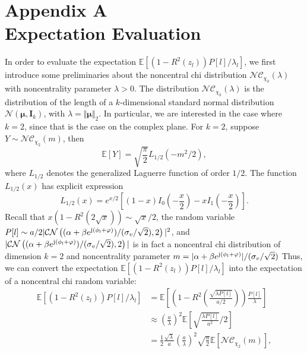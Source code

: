\documentclass[12pt,draftclsnofoot,journal,onecolumn]{IEEEtran}
\theoremstyle{nonumberplain}
\def \CN {\mathcal{CN}}
\def \j  {\rm {j}}
\def \nc {\mathcal{NC}}
\begin{document}
\section*{Appendix A\\ Expectation Evaluation}\label{appendix: expectation evaluation}
    In order to evaluate the expectation $\mathbb{E}[(1-R^2(z_l))P[l]/\lambda_l]$, we first introduce some preliminaries about the noncentral chi distribution $\nc_{\chi_k}(\lambda)$ with noncentrality parameter $\lambda>0$. The distribution $\nc_{\chi_k}(\lambda)$ is the distribution of the length of a $k$-dimensional standard normal distribution $\mathcal{N}({\bm \mu}, {\bm I}_k)$, with $\lambda = \Vert {\bm \mu} \Vert_2$. In particular, we are interested in the case where $k=2$, since that is the case on the complex plane. For  $k=2$, suppose $Y \sim \nc_{\chi_2}(m)$, then
    \begin{equation}
        \mathbb{E}\left[Y\right] = \sqrt{\frac{\pi}{2}}L_{1/2}(-m^2/2),
        \label{eqn:noncentral chi mean}
    \end{equation}
    where $L_{1/2}$ denotes the generalized Laguerre function of order $1/2$. The function $L_{1/2}(x)$ has explicit expression 
    \begin{equation}
        L_{1/2}(x) = e^{x/2}\left[(1-x)I_0\left(-\frac{x}{2}\right)-xI_1\left(-\frac{x}{2}\right) \right].
        \label{eqn:Laguerre half order}
    \end{equation}
    Recall that $x(1-R^2(2\sqrt{x})) \sim \sqrt{x}/2$, the random variable $P[l] \sim a/2 \vert \CN\left((\alpha + \beta e^{\j (\phi_l + \varphi)})/(\sigma_v / \sqrt{2}), 2\right)\vert^2$, and $\vert \CN\left((\alpha + \beta e^{\j (\phi_l + \varphi)})/(\sigma_v / \sqrt{2}), 2\right)\vert$ is in fact a noncentral chi distribution of dimension $k=2$ and noncentrality parameter $m=\lvert\alpha + \beta e^{\j (\phi_l + \varphi)}\rvert/(\sigma_v / \sqrt{2})$ Thus, we can convert the expectation  $\mathbb{E}[(1-R^2(z_l))P[l]/\lambda_l]$ into the expectation of a noncentral chi random variable:
    \begin{equation}
        \begin{aligned}
        \mathbb{E}[(1-R^2(z_l))P[l]/\lambda_l] & = \mathbb{E}\left[\left(1-R^2\left(\frac{\sqrt{\lambda P[l]}}{a/2}\right)\right)\frac{P[l]}{\lambda}\right] \\
        & \approx \left(\frac{a}{\lambda}\right)^2 \mathbb{E}\left[ \sqrt{\frac{\lambda P[l]}{a^2}}/2 \right]\\
        & = \frac{1}{2}\frac{\sqrt{\lambda}}{a}\left(\frac{a}{\lambda}\right)^2 \sqrt{\frac{a}{2}}\mathbb{E}\left[\nc_{\chi_2}(m)\right],\\
        \end{aligned}
        \label{eqn:approx evaluation}
    \end{equation}
\end{document}
